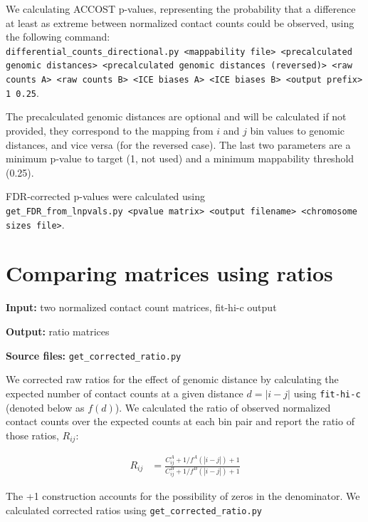 \documentclass[11pt]{amsart}
\begin{document}
We calculating ACCOST p-values, representing the probability that a difference at least as extreme between normalized contact counts could be observed, using the following command:
\\
\texttt{differential\_counts\_directional.py <mappability file> <precalculated genomic distances> <precalculated genomic distances (reversed)> <raw counts A> <raw counts B> <ICE biases A> <ICE biases B> <output prefix> 1 0.25}.

The precalculated genomic distances are optional and will be calculated if not provided, they correspond to the mapping from $i$ and $j$ bin values to genomic distances, and vice versa (for the reversed case). The last two parameters are a minimum p-value to target (1, not used) and a minimum mappability threshold (0.25).

FDR-corrected p-values were calculated using
\\
\texttt{get\_FDR\_from\_lnpvals.py <pvalue matrix> <output filename> <chromosome sizes file>}.

\section{Comparing matrices using ratios}

\textbf{Input:} two normalized contact count matrices, fit-hi-c output

\textbf{Output:} ratio matrices

\textbf{Source files:} \texttt{get\_corrected\_ratio.py}

We corrected raw ratios for the effect of genomic distance by calculating the expected number of contact counts at a given distance $d = | i-j |$ using \texttt{fit-hi-c} (denoted below as $f(d)$). We calculated the ratio of observed normalized contact counts over the expected counts at each bin pair and report the ratio of those ratios, $R_{ij}$:

\begin{align}
R_{ij} &= \frac{C^A_{ij} + 1 / f^A(|i-j|) + 1}{C^B_{ij} + 1 / f^B(|i-j|) + 1 }
\end{align}

The +1 construction accounts for the possibility of zeros in the denominator. We calculated corrected ratios using \texttt{get\_corrected\_ratio.py}


\end{document}
